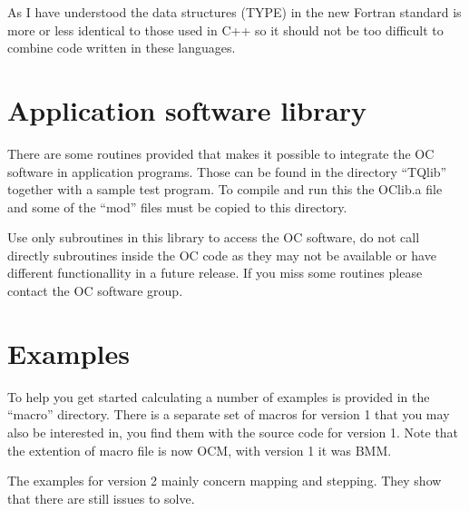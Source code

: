 \documentclass[12pt]{article}
\begin{document}
As I have understood the data structures (TYPE) in the new Fortran
standard is more or less identical to those used in C++ so it should
not be too difficult to combine code written in these languages.

\section{Application software library}

There are some routines provided that makes it possible to integrate
the OC software in application programs.  Those can be found in the
directory ``TQlib'' together with a sample test program.  To compile
and run this the OClib.a file and some of the ``mod'' files must be
copied to this directory.

Use only subroutines in this library to access the OC software, do not
call directly subroutines inside the OC code as they may not be
available or have different functionallity in a future release.  If
you miss some routines please contact the OC software group.

\section{Examples}

To help you get started calculating a number of examples is provided
in the ``macro'' directory.  There is a separate set of macros for
version 1 that you may also be interested in, you find them with the
source code for version 1.  Note that the extention of macro file is
now OCM, with version 1 it was BMM.

The examples for version 2 mainly concern mapping and stepping.  They
show that there are still issues to solve.
\end{document}
